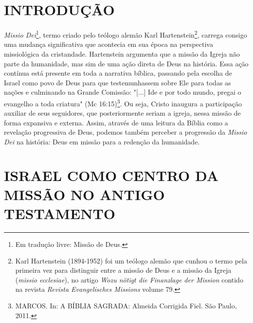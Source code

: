 \documentclass[
    article,            %
	12pt,				%
	oneside,			%
	a4paper,			%
	chapter=TITLE,		%
	section=TITLE,		%
	english,			%
	french,				%
	spanish,			%
	brazil				%
	]{abntex2}
\begin{document}
\section{INTRODUÇÃO}
\emph{Missio Dei}\footnote{Em tradução livre: Missão de Deus.}, termo criado pelo teólogo alemão Karl Hartenstein\footnote{Karl Hartenstein (1894-1952) foi um teólogo alemão que cunhou o termo pela primeira vez para distinguir entre a missão de Deus e a missão da Igreja (\emph{missio ecclesiae}), no artigo \emph{Wozu nötigt die Finanzlage der Mission} contido na revista \emph{Revista Evangelisches Missions} volume 79.}, carrega consigo uma mudança significativa que acontecia em sua época na perspectiva missiológica da cristandade. Hartenstein argumenta que a missão da Igreja não parte da humanidade, mas sim de uma ação direta de Deus na história. Essa ação contínua está presente em toda a narrativa bíblica, passando pela escolha de Israel como povo de Deus para que testemunhassem sobre Ele para todas as nações e culminando na Grande Comissão: "[...] Ide e por todo mundo, pregai o evangelho a toda criatura" (Mc 16:15)\footnote{MARCOS. In: A BÍBLIA SAGRADA: Almeida Corrigida Fiel. São Paulo, 2011.}. Ou seja, Cristo inaugura a participação auxiliar de seus seguidores, que posteriormente seriam a igreja, nessa missão de forma expansiva e externa. Assim, através de uma leitura da Bíblia como a revelação progressiva de Deus, podemos também perceber a progressão da \emph{Missio Dei} na história: Deus em missão para a redenção da humanidade.
\section{ISRAEL COMO CENTRO DA MISSÃO NO ANTIGO TESTAMENTO}
\end{document}
